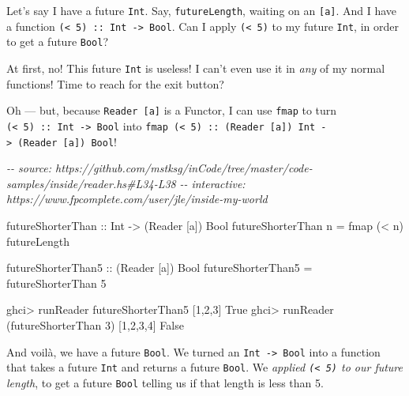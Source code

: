 \documentclass[]{article}
\newenvironment{Shaded}{}{}
\newcommand{\CommentTok}[1]{\textcolor[rgb]{0.38,0.63,0.69}{\textit{#1}}}
\newcommand{\DataTypeTok}[1]{\textcolor[rgb]{0.56,0.13,0.00}{#1}}
\newcommand{\DecValTok}[1]{\textcolor[rgb]{0.25,0.63,0.44}{#1}}
\newcommand{\FunctionTok}[1]{\textcolor[rgb]{0.02,0.16,0.49}{#1}}
\newcommand{\NormalTok}[1]{#1}
\newcommand{\OperatorTok}[1]{\textcolor[rgb]{0.40,0.40,0.40}{#1}}
\newcommand{\OtherTok}[1]{\textcolor[rgb]{0.00,0.44,0.13}{#1}}
\begin{document}
Let's say I have a future \texttt{Int}. Say, \texttt{futureLength}, waiting on
an \texttt{{[}a{]}}. And I have a function
\texttt{(\textless{}\ 5)\ ::\ Int\ -\textgreater{}\ Bool}. Can I apply
\texttt{(\textless{}\ 5)} to my future \texttt{Int}, in order to get a future
\texttt{Bool}?

At first, no! This future \texttt{Int} is useless! I can't even use it in
\emph{any} of my normal functions! Time to reach for the exit button?

Oh --- but, because \texttt{Reader\ {[}a{]}} is a Functor, I can use
\texttt{fmap} to turn \texttt{(\textless{}\ 5)\ ::\ Int\ -\textgreater{}\ Bool}
into
\texttt{fmap\ (\textless{}\ 5)\ ::\ (Reader\ {[}a{]})\ Int\ -\textgreater{}\ (Reader\ {[}a{]})\ Bool}!

\begin{Shaded}
\begin{Highlighting}[]
\CommentTok{{-}{-} source: https://github.com/mstksg/inCode/tree/master/code{-}samples/inside/reader.hs\#L34{-}L38}
\CommentTok{{-}{-} interactive: https://www.fpcomplete.com/user/jle/inside{-}my{-}world}

\OtherTok{futureShorterThan ::} \DataTypeTok{Int} \OtherTok{{-}\textgreater{}}\NormalTok{ (}\DataTypeTok{Reader}\NormalTok{ [a]) }\DataTypeTok{Bool}
\NormalTok{futureShorterThan n }\OtherTok{=} \FunctionTok{fmap}\NormalTok{ (}\OperatorTok{\textless{}}\NormalTok{ n) futureLength}

\OtherTok{futureShorterThan5 ::}\NormalTok{ (}\DataTypeTok{Reader}\NormalTok{ [a]) }\DataTypeTok{Bool}
\NormalTok{futureShorterThan5 }\OtherTok{=}\NormalTok{ futureShorterThan }\DecValTok{5}
\end{Highlighting}
\end{Shaded}

\begin{Shaded}
\begin{Highlighting}[]
\NormalTok{ghci}\OperatorTok{\textgreater{}}\NormalTok{ runReader futureShorterThan5 [}\DecValTok{1}\NormalTok{,}\DecValTok{2}\NormalTok{,}\DecValTok{3}\NormalTok{]}
\DataTypeTok{True}
\NormalTok{ghci}\OperatorTok{\textgreater{}}\NormalTok{ runReader (futureShorterThan }\DecValTok{3}\NormalTok{) [}\DecValTok{1}\NormalTok{,}\DecValTok{2}\NormalTok{,}\DecValTok{3}\NormalTok{,}\DecValTok{4}\NormalTok{]}
\DataTypeTok{False}
\end{Highlighting}
\end{Shaded}

And voilà, we have a future \texttt{Bool}. We turned an
\texttt{Int\ -\textgreater{}\ Bool} into a function that takes a future
\texttt{Int} and returns a future \texttt{Bool}. We \emph{applied
\texttt{(\textless{}\ 5)} to our future length}, to get a future \texttt{Bool}
telling us if that length is less than 5.
\end{document}

